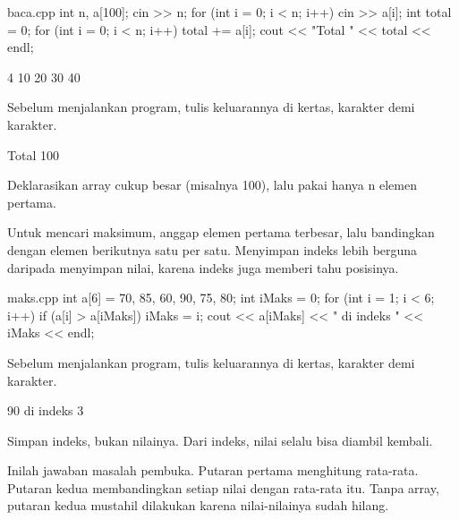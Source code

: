 \documentclass[a4paper]{article}
\begin{document}
\begin{MKode}{baca.cpp}
int n, a[100];
cin >> n;
for (int i = 0; i < n; i++) {
    cin >> a[i];
}
int total = 0;
for (int i = 0; i < n; i++) {
    total += a[i];
}
cout << "Total " << total << endl;
\end{MKode}
\begin{MKeluaran}[title={Masukan}]
4
10 20 30 40
\end{MKeluaran}
\begin{Tebak}[]
Sebelum menjalankan program, tulis keluarannya di kertas, karakter demi karakter.
\end{Tebak}
\begin{Jawaban}[]
\begin{MKeluaran}[]
Total 100
\end{MKeluaran}
Deklarasikan array cukup besar (misalnya 100), lalu pakai hanya n elemen pertama.
\end{Jawaban}
Untuk mencari maksimum, anggap elemen pertama terbesar, lalu bandingkan dengan elemen berikutnya satu per satu. Menyimpan indeks lebih berguna daripada menyimpan nilai, karena indeks juga memberi tahu posisinya.

\begin{MKode}{maks.cpp}
int a[6] = {70, 85, 60, 90, 75, 80};
int iMaks = 0;
for (int i = 1; i < 6; i++) {
    if (a[i] > a[iMaks]) {
        iMaks = i;
    }
}
cout << a[iMaks] << " di indeks " << iMaks << endl;
\end{MKode}
\begin{Tebak}[]
Sebelum menjalankan program, tulis keluarannya di kertas, karakter demi karakter.
\end{Tebak}
\begin{Jawaban}[]
\begin{MKeluaran}[]
90 di indeks 3
\end{MKeluaran}
Simpan indeks, bukan nilainya. Dari indeks, nilai selalu bisa diambil kembali.
\end{Jawaban}
Inilah jawaban masalah pembuka. Putaran pertama menghitung rata-rata. Putaran kedua membandingkan setiap nilai dengan rata-rata itu. Tanpa array, putaran kedua mustahil dilakukan karena nilai-nilainya sudah hilang.
\end{document}
